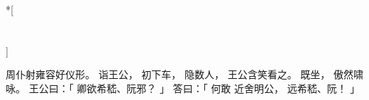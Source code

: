 
\switchcolumn[0]*[\section{}]

周仆射雍容好仪形。
诣王公，
初下车，
隐数人，
王公含笑看之。
既坐，
傲然啸咏。
王公曰：「
    卿欲希嵇、阮邪？
」
答曰：「
    何敢
    近舍明公，
    远希嵇、阮！
」

\switchcolumn


